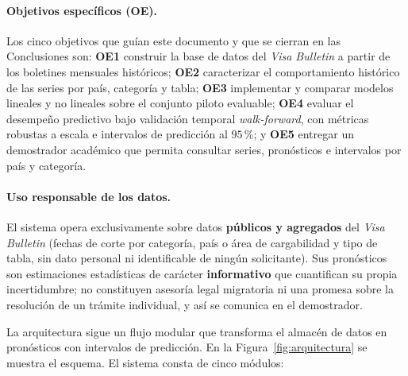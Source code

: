 \documentclass[12pt,letterpaper]{report}
\begin{document}
\paragraph{Objetivos específicos (OE).} Los cinco objetivos que guían este documento y que se
cierran en las Conclusiones son: \textbf{OE1} construir la base de datos del \textit{Visa
Bulletin} a partir de los boletines mensuales históricos; \textbf{OE2} caracterizar el
comportamiento histórico de las series por país, categoría y tabla; \textbf{OE3} implementar
y comparar modelos lineales y no lineales sobre el conjunto piloto evaluable; \textbf{OE4}
evaluar el desempeño predictivo bajo validación temporal \textit{walk-forward}, con métricas
robustas a escala e intervalos de predicción al $95$\,\%; y \textbf{OE5} entregar un
demostrador académico que permita consultar series, pronósticos e intervalos por país y
categoría.

\paragraph{Uso responsable de los datos.} El sistema opera exclusivamente sobre datos
\textbf{públicos y agregados} del \textit{Visa Bulletin} (fechas de corte por categoría,
país o área de cargabilidad y tipo de tabla, sin dato personal ni identificable de ningún
solicitante). Sus pronósticos son estimaciones estadísticas de carácter \textbf{informativo}
que cuantifican su propia incertidumbre; no constituyen asesoría legal migratoria ni una
promesa sobre la resolución de un trámite individual, y así se comunica en el demostrador.

La arquitectura sigue un flujo modular que transforma el almacén de datos en
pronósticos con intervalos de predicción. En la Figura~\ref{fig:arquitectura} se
muestra el esquema. El sistema consta de cinco módulos:
\end{document}
